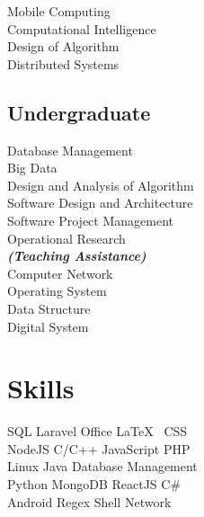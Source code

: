 \documentclass[letterpaper]{deedy-resume} %
\begin{document}
\begin{minipage}[t]{0.33\textwidth}
Mobile Computing \\
Computational Intelligence \\
Design of Algorithm \\
Distributed Systems \\
\sectionspace


\subsection{Undergraduate}

Database Management \\
Big Data \\
Design and Analysis of Algorithm \\
Software Design and Architecture \\
Software Project Management \\
Operational Research \\
{\footnotesize \textit{\textbf{(Teaching Assistance) }}} \\
Computer Network \\
Operating System \\
Data Structure \\
Digital System
\sectionspace


\section{Skills}

SQL \textbullet{} Laravel \textbullet{} Office \textbullet{} \LaTeX\ \textbullet{} CSS \\
NodeJS \textbullet{} C/C++ \textbullet{} JavaScript \textbullet{} PHP \\
Linux \textbullet{} Java \textbullet{} Database Management \\
Python \textbullet{} MongoDB \textbullet{} ReactJS \textbullet{} C\# \\
Android \textbullet{} Regex \textbullet{} Shell \textbullet{} Network
\sectionspace


\end{minipage} %
\end{document}
